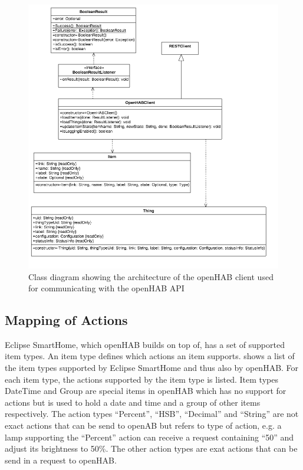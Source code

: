 \begin{figure}[h!]
\centering
\includegraphics[width=\textwidth]{images/uml-openhab-client}
\caption{Class diagram showing the architecture of the openHAB client used for communicating with the openHAB API}
\label{fig:design:communication-with-openhab:class-diagram-openhab-client}
\end{figure}

\subsection{Mapping of Actions}

Eclipse SmartHome, which openHAB builds on top of, has a set of supported item types. An item type defines which actions an item supports.  shows a list of the item types supported by Eclipse SmartHome and thus also by openHAB. For each item type, the actions supported by the item type is listed. Item types DateTime and Group are special items in openHAB which has no support for actions but is used to hold a date and time and a group of other items respectively.
The action types ``Percent'', ``HSB'', ``Decimal'' and ``String'' are not exact actions that can be send to openAB but refers to type of action, e.g. a lamp supporting the ``Percent'' action can receive a request containing ``50'' and adjust its brightness to 50\%. The other action types are exat actions that can be send in a request to openHAB.

